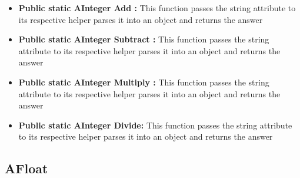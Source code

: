 \documentclass{article}
\begin{document}
\begin{itemize}
The logic is as follows:
\begin{itemize}
    \item The absolute values of both input strings are obtained by removing leading zeroes and signs using the \texttt{absolute\_string} and \texttt{remove\_leading\_zeroes} functions.
    \item An exception is thrown if the divisor is zero to avoid division by zero.
    \item If the dividend is smaller than the divisor, the quotient is immediately set to "0".
    \item A loop iterates through the digits of the dividend, creating a temporary dividend and performing repeated subtraction of the divisor from it.
    \item The quotient is built by counting how many times the divisor can be subtracted from the temporary dividend.
    \item After the division is complete, the function removes any leading zeroes from the quotient and prepends the appropriate sign based on the signs of the input strings.
\end{itemize}\\

\item\textbf{Public static AInteger Add :} This function passes the string attribute to its respective helper parses it into an object and returns the answer

\item\textbf{Public static AInteger Subtract :} This function passes the string attribute to its respective helper parses it into an object and returns the answer

\item\textbf{Public static AInteger Multiply :} This function passes the string attribute to its respective helper parses it into an object and returns the answer

\item\textbf{Public static AInteger Divide:} This function passes the string attribute to its respective helper parses it into an object and returns the answer

\end{itemize}

\subsection{AFloat}
\end{document}
